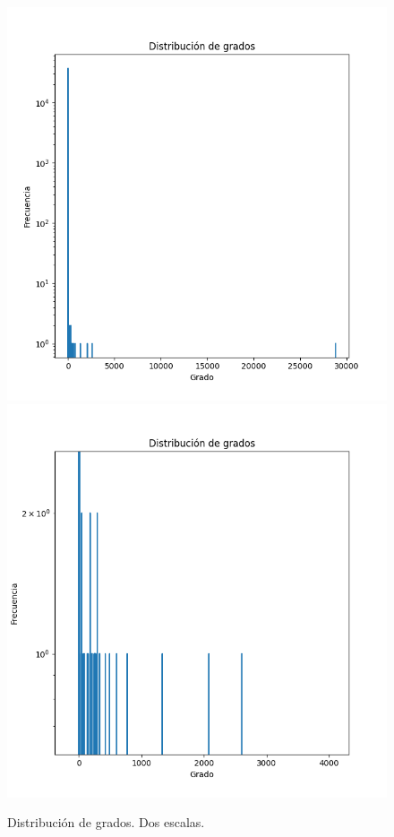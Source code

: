 \documentclass{article}
\begin{document}
    \begin{figure}
        \centering
        \includegraphics[scale=0.6]{degree_dist.png}
        \includegraphics[scale=0.6]{degree_dist_detail.png}
        \caption{Distribución de grados. Dos escalas.}
        \label{fig:avgdeg}
    \end{figure}
\end{document}
